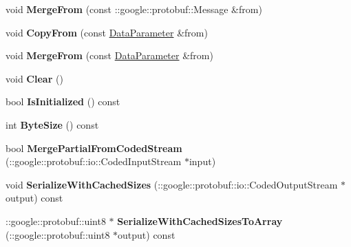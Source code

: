 \begin{DoxyCompactItemize}
void {\bfseries Merge\+From} (const \+::google\+::protobuf\+::\+Message \&from)
\item 
\mbox{\label{classcaffe_1_1_data_parameter_a97c3a872a5a5a1f8ae4b964be294d06d}} 
void {\bfseries Copy\+From} (const \mbox{\hyperlink{classcaffe_1_1_data_parameter}{Data\+Parameter}} \&from)
\item 
\mbox{\label{classcaffe_1_1_data_parameter_ac40c46f8b306e225d9abc44f246db1b4}} 
void {\bfseries Merge\+From} (const \mbox{\hyperlink{classcaffe_1_1_data_parameter}{Data\+Parameter}} \&from)
\item 
\mbox{\label{classcaffe_1_1_data_parameter_aef48755220b98346aa3423f69d4e6a7d}} 
void {\bfseries Clear} ()
\item 
\mbox{\label{classcaffe_1_1_data_parameter_a4b91ccbaba3254a3743a5a16a9f2d4cf}} 
bool {\bfseries Is\+Initialized} () const
\item 
\mbox{\label{classcaffe_1_1_data_parameter_ad51659abd1c05108daf83f540df92db8}} 
int {\bfseries Byte\+Size} () const
\item 
\mbox{\label{classcaffe_1_1_data_parameter_af43db8960acb563548c21ba46b997005}} 
bool {\bfseries Merge\+Partial\+From\+Coded\+Stream} (\+::google\+::protobuf\+::io\+::\+Coded\+Input\+Stream $\ast$input)
\item 
\mbox{\label{classcaffe_1_1_data_parameter_abfa1376cc86f85c8e18b12be85c2a80f}} 
void {\bfseries Serialize\+With\+Cached\+Sizes} (\+::google\+::protobuf\+::io\+::\+Coded\+Output\+Stream $\ast$output) const
\item 
\mbox{\label{classcaffe_1_1_data_parameter_aeaa67bf557a6ff254ae19d25bb173eca}} 
\+::google\+::protobuf\+::uint8 $\ast$ {\bfseries Serialize\+With\+Cached\+Sizes\+To\+Array} (\+::google\+::protobuf\+::uint8 $\ast$output) const
\item 
\mbox{\label{classcaffe_1_1_data_parameter_a2c64ee99f4adbb2e48ed52868b94014b}} 

\end{DoxyCompactItemize}
